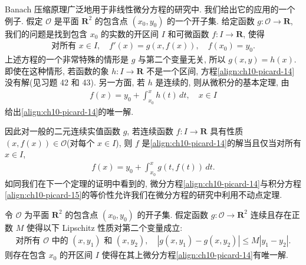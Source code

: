 \documentclass[../../main.tex]{subfiles}
\begin{document}
Banach 压缩原理广泛地用于非线性微分方程的研究中. 我们给出它的应用的一个例子. 假定 $\mathcal{O}$ 是平面 $\mathbf{R}^{2}$ 的包含点 $(x_{0},y_{0})$ 的一个开子集. 给定函数 $g:\mathcal{O}\to\mathbf{R}$, 我们的问题是找到包含 $x_{0}$ 的实数的开区间 $I$ 和可微函数 $f:I\to\mathbf{R}$, 使得
\begin{align}
\text{对所有 }x\in I,\quad f'(x)=g(x,f(x)),\quad f(x_{0})=y_{0}.\label{align:ch10-picard-14}
\end{align}
上述方程的一个非常特殊的情形是 $g$ 与第二个变量无关, 所以 $g(x,y)=h(x)$. 即使在这种情形, 若函数的象 $h:I\to\mathbf{R}$ 不是一个区间, 方程\eqref{align:ch10-picard-14}没有解(见习题 42 和 43). 另一方面, 若 $h$ 是连续的, 则从微积分的基本定理, 由
\begin{align*}
f(x)=y_{0}+\int_{x_{0}}^{x}h(t)\,dt,\quad x\in I
\end{align*}
给出\eqref{align:ch10-picard-14}的唯一解.

因此对一般的二元连续实值函数 $g$, 若连续函数 $f:I\to\mathbf{R}$ 具有性质 $(x,f(x))\in\mathcal{O}$(对每个 $x\in I$), 则 $f$ 是\eqref{align:ch10-picard-14}的解当且仅当对所有 $x\in I$,
\begin{align}
f(x)=y_{0}+\int_{x_{0}}^{x}g(t,f(t))\,dt.\label{align:ch10-picard-15}
\end{align}
如同我们在下一个定理的证明中看到的, 微分方程\eqref{align:ch10-picard-14}与积分方程\eqref{align:ch10-picard-15}的等价性允许我们在微分方程的研究中利用不动点定理.

\begin{theorem}\label{theorem:ch10-picard}
令 $\mathcal{O}$ 为平面 $\mathbf{R}^{2}$ 的包含点 $(x_{0},y_{0})$ 的开子集. 假定函数 $g:\mathcal{O}\to\mathbf{R}^{2}$ 连续且存在正数 $M$ 使得以下 Lipschitz 性质对第二个变量成立:
\begin{align}
\text{对所有 }\mathcal{O}\text{ 中的 }(x,y_{1})\text{ 和 }(x,y_{2}),\quad|g(x,y_{1})-g(x,y_{2})|\leqslant M|y_{1}-y_{2}|.\label{align:ch10-picard-16}
\end{align}
则存在包含 $x_{0}$ 的开区间 $I$ 使得在其上微分方程\eqref{align:ch10-picard-14}有唯一解.
\end{theorem}
\end{document}
